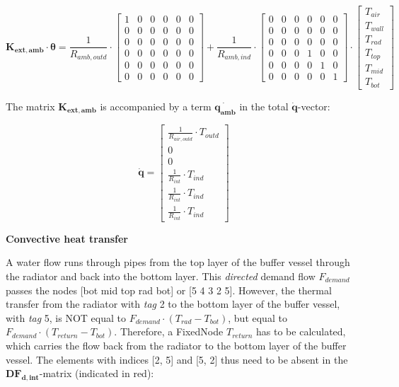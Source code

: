 \begin{equation}
	\mathbf{K_{ext,amb}} \cdot \boldsymbol{\theta} = 
	\frac{1}{R_{amb,outd}} \cdot
	\begin{bmatrix}
		1 & 0 & 0 & 0 & 0 & 0  \\
		0 & 0 & 0 & 0 & 0 & 0 \\
		0 & 0 & 0 & 0 & 0 & 0 \\
		0 & 0  & 0 &  0 & 0 & 0 \\
		0 & 0 & 0 & 0 &  0 & 0 \\
		0 & 0 & 0 & 0 & 0 & 0  
	\end{bmatrix}
	+
	\frac{1}{R_{amb,ind}} \cdot
	\begin{bmatrix}
		0 & 0 & 0 & 0 & 0 & 0  \\
		0 & 0 & 0 & 0 & 0 & 0 \\
		0 & 0 & 0 & 0 & 0 & 0 \\
		0 & 0  & 0 &  1 & 0 & 0 \\
		0 & 0 & 0 & 0 &  1 & 0 \\
		0 & 0 & 0 & 0 & 0 &  1  
	\end{bmatrix}
	\cdot
	\begin{bmatrix}
		T_{air} \\
		T_{wall} \\
		T_{rad} \\
		T_{top} \\
		T_{mid} \\
		T_{bot}
	\end{bmatrix}
\end{equation}


The matrix $\mathbf{K_{ext,amb}}$ is accompanied by a term $\mathbf{\dot{q_{amb}}}$ in the total $\mathbf{\dot{q}}$-vector:

\begin{equation}
	\mathbf{\dot{q}} = 
	\begin{bmatrix}
		\frac{1}{R_{air, outd}} \cdot T_{outd} \\
		0 \\
		0 \\
		\frac{1}{R_{int}} \cdot T_{ind} \\
		\frac{1}{R_{int}} \cdot T_{ind} \\
		\frac{1}{R_{int}} \cdot T_{ind} 
	\end{bmatrix}
\end{equation}

\textbf{Convective heat transfer}

A water flow runs through pipes from the top layer of the buffer vessel through the radiator and back into the bottom layer. This \emph{directed} demand flow $F_{demand}$ passes the nodes [bot mid top rad bot] or [5 4 3 2 5].
However, the thermal transfer from the radiator with \emph{tag} 2 to the bottom layer of the buffer vessel, with \emph{tag} 5, is NOT equal to $F_{demand} \cdot (T_{rad} - T_{bot})$, but equal to $F_{demand} \cdot (T_{return} - T_{bot})$.
Therefore, a \textsf{FixedNode} $T_{return}$ has to be calculated, which carries the flow back from the radiator to the bottom layer of the buffer vessel. The elements with indices [2, 5] and [5, 2] thus need to be absent in the $\mathbf{DF_{d,int}}$-matrix (indicated in red):

